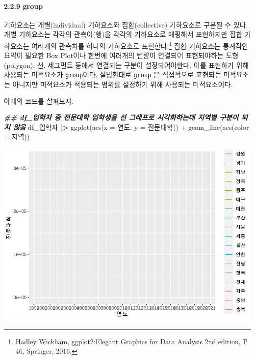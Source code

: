 \documentclass[
]{article}
\newenvironment{Shaded}{\begin{snugshade}}{\end{snugshade}}
\newcommand{\AttributeTok}[1]{\textcolor[rgb]{0.77,0.63,0.00}{#1}}
\newcommand{\DocumentationTok}[1]{\textcolor[rgb]{0.56,0.35,0.01}{\textbf{\textit{#1}}}}
\newcommand{\ErrorTok}[1]{\textcolor[rgb]{0.64,0.00,0.00}{\textbf{#1}}}
\newcommand{\FunctionTok}[1]{\textcolor[rgb]{0.00,0.00,0.00}{#1}}
\newcommand{\NormalTok}[1]{#1}
\newcommand{\SpecialCharTok}[1]{\textcolor[rgb]{0.00,0.00,0.00}{#1}}
\begin{document}
\hypertarget{group}{%
\paragraph{2.2.9 group}\label{group}}

기하요소는 개별(individual) 기하요소와 집합(collective) 기하요소로 구분될 수 있다. 개별 기하요소는 각각의 관측이(행)을 각각의 기하요소로 매핑해서 표현하지만 집합 기하요소는 여러개의 관측치를 하나의 기하요소로 표현한다.\footnote{Hadley Wickham, ggplot2:Elegant Graphics for Data Analysis 2nd edition, P 46, Springer, 2016.} 집합 기하요소는 통계적인 요약이 필요한 Box Plot이나 한번에 여러개의 변량이 연결되어 표현되야하는 도형(polygon), 선, 세그먼트 등에서 연결되는 구분이 설정되어야한다. 이를 표현하기 위해 사용되는 미적요소가 \texttt{group}이다. 설명한대로 \texttt{group} 은 직접적으로 표현되는 미적요소는 아니지만 미적요소가 적용되는 범위를 설정하기 위해 사용되는 미적요소이다.

아래의 코드를 살펴보자.

\begin{Shaded}
\begin{Highlighting}[]
\DocumentationTok{\#\# df\_입학자 중 전문대학 입학생을 선 그래프로 시각화하는데 지역별 구분이 되지 않음}
\NormalTok{df\_입학자 }\SpecialCharTok{|}\ErrorTok{\textgreater{}}
  \FunctionTok{ggplot}\NormalTok{(}\FunctionTok{aes}\NormalTok{(}\AttributeTok{x =}\NormalTok{ 연도, }\AttributeTok{y =}\NormalTok{ 전문대학)) }\SpecialCharTok{+}
  \FunctionTok{geom\_line}\NormalTok{(}\FunctionTok{aes}\NormalTok{(}\AttributeTok{color =}\NormalTok{ 지역))}
\end{Highlighting}
\end{Shaded}

\includegraphics{chap3_files/figure-latex/unnamed-chunk-17-1.pdf}
\end{document}
